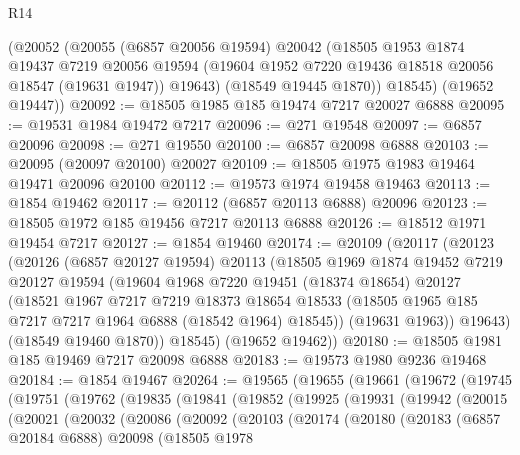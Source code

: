 \begin{lexlean}{R14}
\begin{coremodule}
      (@20052
        (@20055
          (@6857 @20056 @19594)
          @20042
          (@18505
            @1953
            @1874
            @19437
            @7219
            @20056
            @19594
            (@19604 @1952 @7220 @19436 @18518 @20056 @18547 (@19631 @1947))
            @19643)
          (@18549 @19445 @1870))
        @18545)
      (@19652 @19447))
@20092 := @18505 @1985 @185 @19474 @7217 @20027 @6888
@20095 := @19531 @1984 @19472 @7217
@20096 := @271 @19548
@20097 := @6857 @20096
@20098 := @271 @19550
@20100 := @6857 @20098 @6888
@20103 := @20095 (@20097 @20100) @20027
@20109 := @18505 @1975 @1983 @19464 @19471 @20096 @20100
@20112 := @19573 @1974 @19458 @19463
@20113 := @1854 @19462
@20117 := @20112 (@6857 @20113 @6888) @20096
@20123 := @18505 @1972 @185 @19456 @7217 @20113 @6888
@20126 := @18512 @1971 @19454 @7217
@20127 := @1854 @19460
@20174 := @20109
    (@20117
      (@20123
        (@20126
          (@6857 @20127 @19594)
          @20113
          (@18505
            @1969
            @1874
            @19452
            @7219
            @20127
            @19594
            (@19604
              @1968
              @7220
              @19451
              (@18374 @18654)
              @20127
              (@18521
                @1967
                @7217
                @7219
                @18373
                @18654
                @18533
                (@18505 @1965 @185 @7217 @7217 @1964 @6888 (@18542 @1964) @18545))
              (@19631 @1963))
            @19643)
          (@18549 @19460 @1870))
        @18545)
      (@19652 @19462))
@20180 := @18505 @1981 @185 @19469 @7217 @20098 @6888
@20183 := @19573 @1980 @9236 @19468
@20184 := @1854 @19467
@20264 := @19565
    (@19655
      (@19661
        (@19672
          (@19745
            (@19751
              (@19762
                (@19835
                  (@19841
                    (@19852
                      (@19925
                        (@19931
                          (@19942
                            (@20015
                              (@20021
                                (@20032
                                  (@20086
                                    (@20092
                                      (@20103
                                        (@20174
                                          (@20180
                                            (@20183
                                              (@6857 @20184 @6888)
                                              @20098
                                              (@18505
                                                @1978

\end{coremodule}
\end{lexlean}
